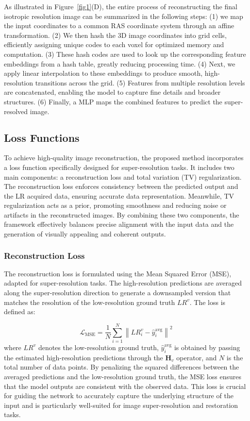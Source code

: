 \documentclass[AMA,STIX2COL]{MRM}
\begin{document}
As illustrated in Figure~\ref{fig1}(D), the entire process of reconstructing the final isotropic resolution image can be summarized in the following steps: (1) we map the input coordinates to a common RAS coordinate system through an affine transformation. (2) We then hash the 3D image coordinates into grid cells, efficiently assigning unique codes to each voxel for optimized memory and computation. (3) These hash codes are used to look up the corresponding feature embeddings from a hash table, greatly reducing processing time. (4) Next, we apply linear interpolation to these embeddings to produce smooth, high-resolution transitions across the grid. (5) Features from multiple resolution levels are concatenated, enabling the model to capture fine details and broader structures. (6) Finally, a MLP maps the combined features to predict the super-resolved image.

\subsection{Loss Functions}
To achieve high-quality image reconstruction, the proposed method incorporates a loss function specifically designed for super-resolution tasks. It includes two main components: a reconstruction loss and total variation (TV) regularization. The reconstruction loss enforces consistency between the predicted output and the LR acquired data, ensuring accurate data representation. Meanwhile, TV regularization acts as a prior, promoting smoothness and reducing noise or artifacts in the reconstructed images. By combining these two components, the framework effectively balances precise alignment with the input data and the generation of visually appealing and coherent outputs.


\subsubsection{Reconstruction Loss}
The reconstruction loss is formulated using the Mean Squared Error (MSE), adapted for super-resolution tasks. The high-resolution predictions are averaged along the super-resolution direction to generate a downsampled version that matches the resolution of the low-resolution ground truth $LR^v$. The loss is defined as:

\begin{equation}
\mathcal{L}_{\mathrm{MSE}}=\frac{1}{N} \sum_{i=1}^N\left\|L R_i^v-\hat{y}_i^{\mathrm{avg}}\right\|^2
\end{equation}
%
where $LR^v$ denotes the low-resolution ground truth, $\hat{y}_i^{\mathrm{avg}}$ is obtained by passing the estimated high-resolution predictions through the $\mathbf{H}_v$ operator, and $N$ is the total number of data points. By penalizing the squared differences between the averaged predictions and the low-resolution ground truth, the MSE loss ensures that the model outputs are consistent with the observed data. This loss is crucial for guiding the network to accurately capture the underlying structure of the input and is particularly well-suited for image super-resolution and restoration tasks.
\end{document}
